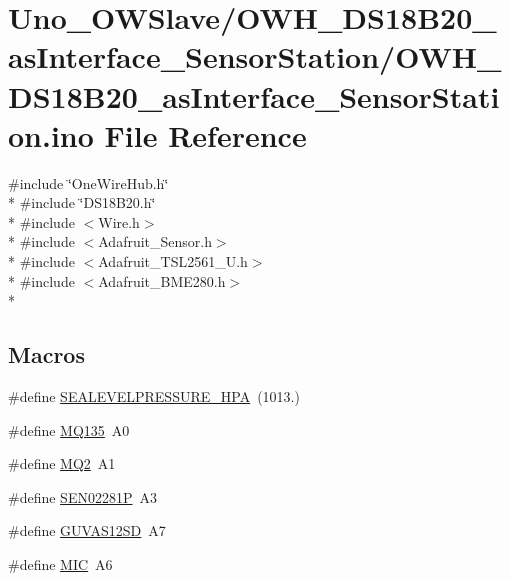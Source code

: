 \hypertarget{OWH__DS18B20__asInterface__SensorStation_8ino}{\section{Uno\-\_\-\-O\-W\-Slave/\-O\-W\-H\-\_\-\-D\-S18\-B20\-\_\-as\-Interface\-\_\-\-Sensor\-Station/\-O\-W\-H\-\_\-\-D\-S18\-B20\-\_\-as\-Interface\-\_\-\-Sensor\-Station.ino File Reference}
\label{OWH__DS18B20__asInterface__SensorStation_8ino}
}
{\ttfamily \#include \char`\"{}One\-Wire\-Hub.\-h\char`\"{}}\\*
{\ttfamily \#include \char`\"{}D\-S18\-B20.\-h\char`\"{}}\\*
{\ttfamily \#include $<$Wire.\-h$>$}\\*
{\ttfamily \#include $<$Adafruit\-\_\-\-Sensor.\-h$>$}\\*
{\ttfamily \#include $<$Adafruit\-\_\-\-T\-S\-L2561\-\_\-\-U.\-h$>$}\\*
{\ttfamily \#include $<$Adafruit\-\_\-\-B\-M\-E280.\-h$>$}\\*
\subsection*{Macros}
\begin{DoxyCompactItemize}
\item 
\#define \hyperlink{OWH__DS18B20__asInterface__SensorStation_8ino_a3fd1be5675628ccdd1cd809ee995b2e7}{S\-E\-A\-L\-E\-V\-E\-L\-P\-R\-E\-S\-S\-U\-R\-E\-\_\-\-H\-P\-A}~(1013.)
\item 
\#define \hyperlink{OWH__DS18B20__asInterface__SensorStation_8ino_a9ee443dafbcc30c5cc792d954d097adf}{M\-Q135}~A0
\item 
\#define \hyperlink{OWH__DS18B20__asInterface__SensorStation_8ino_a90ad8312f4fa156f6bea53837390fb86}{M\-Q2}~A1
\item 
\#define \hyperlink{OWH__DS18B20__asInterface__SensorStation_8ino_aefa70dbae098252447aae93b45b4ea2c}{S\-E\-N02281\-P}~A3
\item 
\#define \hyperlink{OWH__DS18B20__asInterface__SensorStation_8ino_a3a0bfe3da093e16e22254f7fe75b080e}{G\-U\-V\-A\-S12\-S\-D}~A7
\item 
\#define \hyperlink{OWH__DS18B20__asInterface__SensorStation_8ino_a6636551bd86d7647ce3e09781b4d5e4e}{M\-I\-C}~A6
\end{DoxyCompactItemize}
